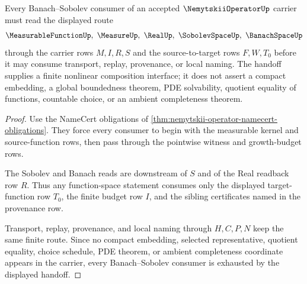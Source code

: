 \begin{theorem}
\label{thm:nemytskii-operator-banach-sobolev-consumer}
Every Banach--Sobolev consumer of an accepted $\NemytskiiOperatorUp$ carrier must read the displayed route
$$
\MeasurableFunctionUp,\ \MeasureUp,\ \RealUp,\ \SobolevSpaceUp,\ \BanachSpaceUp
$$
through the carrier rows $M,I,R,S$ and the source-to-target rows $F,W,T_0$ before it may consume transport, replay, provenance, or local naming. The handoff supplies a finite nonlinear composition interface; it does not assert a compact embedding, a global boundedness theorem, PDE solvability, quotient equality of functions, countable choice, or an ambient completeness theorem.
\end{theorem}
\begin{proof}
Use the NameCert obligations of \autoref{thm:nemytskii-operator-namecert-obligations}. They force every consumer to begin with the measurable kernel and source-function rows, then pass through the pointwise witness and growth-budget rows.

The Sobolev and Banach reads are downstream of $S$ and of the Real readback row $R$. Thus any function-space statement consumes only the displayed target-function row $T_0$, the finite budget row $I$, and the sibling certificates named in the provenance row.

Transport, replay, provenance, and local naming through $H,C,P,N$ keep the same finite route. Since no compact embedding, selected representative, quotient equality, choice schedule, PDE theorem, or ambient completeness coordinate appears in the carrier, every Banach--Sobolev consumer is exhausted by the displayed handoff.
\end{proof}



